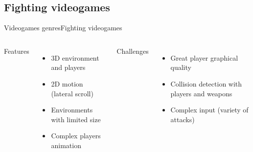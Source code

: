 \documentclass[10pt,compress]{beamer} %
\begin{document}
\subsection[Fighting videogames]{Fighting videogames}
\begin{frame}{Videogames genres}{Fighting videogames}
	\vspace{-0.4cm}
    \begin{columns}
		Features
			\begin{itemize}
			\item 3D environment and players
			\item 2D motion (lateral scroll)
			\item Environments with limited size
			\item Complex players animation
			\end{itemize}
	 	Challenges
			\begin{itemize}
			\item Great player graphical quality
			\item Collision detection with players and weapons
			\item Complex input (variety of attacks)
			\end{itemize}


\end{columns}
\end{frame}
\end{document}
